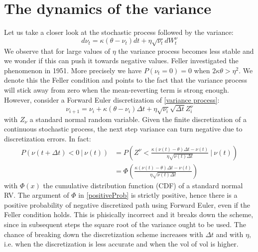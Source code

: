 \documentclass[12pt]{article}
\numberwithin{equation}{section}
\begin{document}
\section{The dynamics of the variance}
Let us take a closer look at the stochastic process followed by the variance:
\begin{equation}\label{variance process}
d\nu_t = \kappa(\theta - \nu_t)dt + \eta\sqrt{\nu_t}dW_t^\nu
\end{equation}
We observe that for large values of $\eta$ the variance process becomes less stable and we wonder if this can push it towards negative values. Feller investigated the phenomenon in 1951. More precisely we have $P(\nu_t = 0) = 0$ when $2\kappa\theta > \eta^2$. We denote this the Feller condition and points to the fact that the variance process will stick away from zero when the mean-reverting term is strong enough. \\
\newline
However, consider a Forward Euler discretization of \ref{variance process}:
\begin{equation}\label{ForwardEuler}
\nu_{i+1} = \nu_{i} + \kappa(\theta - \nu_{i})\Delta t + \eta\sqrt{\nu_{i}}\sqrt{\Delta t}Z_i^\nu
\end{equation}
with $Z_\nu$ a standard normal random variable. Given the finite discretization of a continuous stochastic process, the next step variance can turn negative due to discretization errors. In fact:
\begin{equation} \label{positiveProb}
	\begin{aligned}
	P(\nu(t+ \Delta t)<0 \ | \ \nu(t)) &= P \left ( Z^\nu < \frac{\kappa(\nu(t) - \theta)\Delta t - \nu(t)}{\eta\sqrt{\nu(t)\Delta t}} \ \Bigg| \ \nu(t) 	\right ) \\
	&= \Phi \left ( \frac{\kappa(\nu(t) - \theta)\Delta t - \nu(t)}{\eta\sqrt{\nu(t)\Delta t}} \right )
	\end{aligned}
\end{equation}
with $\Phi(x)$ the cumulative distribution function (CDF) of a standard normal RV. The argument of $\Phi$ in \ref{positiveProb} is strictly positive, hence there is a positive probability of negative discretized path using Forward Euler, even if the Feller condition holds. This is phisically incorrect and it breaks down the scheme, since in subsequent steps the square root of the variance ought to be used. The chance of breaking down the discretization scheme increases with $\Delta t$ and with $\eta$, i.e. when the discretization is less accurate and when the vol of vol is higher.
\end{document}
